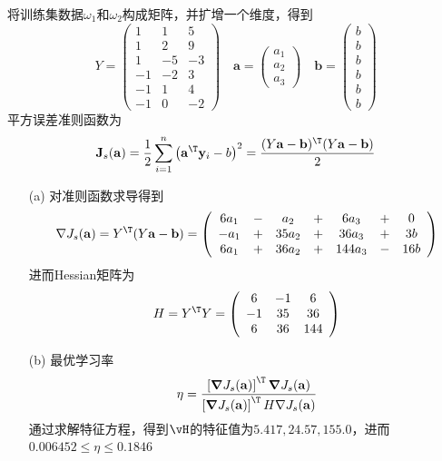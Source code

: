 \documentclass[reportComp]{thesis}
\begin{document}
\begin{answer}
将训练集数据$\omega_1$和$\omega_2$构成矩阵，并扩增一个维度，得到
\[Y =\left(\begin{array}{rrr}{1} & {1} & {5} \\ {1} & {2} & {9} \\ {1} & {-5} & {-3} \\ {-1} & {-2} & {3} \\ {-1} & {1} & {4} \\ {-1} & {0} & {-2}\end{array}\right) \quad \mathbf{a}=\left(\begin{array}{r}{a_{1}} \\ {a_{2}} \\ {a_{3}}\end{array}\right) \quad \mathbf{b}=\left(\begin{array}{c}{b} \\ {b} \\ {b} \\ {b} \\ {b} \\ {b}\end{array}\right)\]
平方误差准则函数为
\[\mathbf{J}_{s}(\mathbf{a})=\frac{1}{2} \sum_{i=1}^{n}\left(\mathbf{a}^\T  \mathbf{y}_{i}-b\right)^{2}=\frac{(Y  \mathbf{a}-\mathbf{b})^\T (Y  \mathbf{a}-\mathbf{b})}{2}\]
\begin{itemize}
	\item [(a)] 对准则函数求导得到
	\[\nabla J_{s}(\mathbf{a})=Y^\T (Y  \mathbf{a}-\mathbf{b})=\left(
	\begin{array}{ccccccc}{6 a_{1}} & {-} & {a_{2}} & {+} & {6 a_{3}} & {+} & {0} \\
	{-a_{1}} & {+} & {35 a_{2}} & {+} & {36 a_{3}} & {+} & {3 b} \\
	{6 a_{1}} & {+} & {36 a_{2}} & {+} & {144 a_{3}} & {-} & {16 b}
	\end{array}\right)\]
	进而Hessian矩阵为
	\[H =Y ^\T  Y =\left(\begin{array}{ccc}{6} & {-1} & {6} \\ {-1} & {35} & {36} \\ {6} & {36} & {144}\end{array}\right)\]
	\item [(b)] 最优学习率
	\[\eta=\frac{\left[\boldsymbol{\nabla} J_{s}(\mathbf{a})\right]^\T  \boldsymbol{\nabla} J_{s}(\mathbf{a})}{\left[\boldsymbol{\nabla} J_{s}(\mathbf{a})\right]^\T  H  \nabla J_{s}(\mathbf{a})}\]
	通过求解特征方程，得到$\vH$的特征值为$5.417,24.57,155.0$，进而$0.006452\leq\eta\leq 0.1846$
\end{itemize}
\end{answer}
\end{document}
